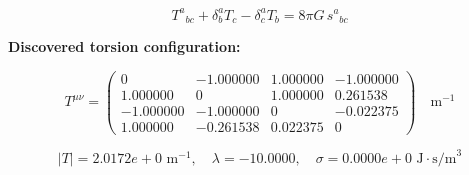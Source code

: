 
\begin{equation}
  T^a{}_{bc} + \delta^a_b T_c - \delta^a_c T_b = 8\pi G \, s^a{}_{bc}
\end{equation}

\textbf{Discovered torsion configuration:}

\begin{equation}
  T^{\mu\nu} = \begin{pmatrix}
    0 & -1.000000 & 1.000000 & -1.000000 \\
    1.000000 & 0 & 1.000000 & 0.261538 \\
    -1.000000 & -1.000000 & 0 & -0.022375 \\
    1.000000 & -0.261538 & 0.022375 & 0
  \end{pmatrix} \quad \text{m}^{-1}
\end{equation}

\begin{equation}
  |T| = 2.0172e+0 \text{ m}^{-1}, \quad
  \lambda = -10.0000, \quad
  \sigma = 0.0000e+0 \text{ J}\cdot\text{s/m}^3
\end{equation}